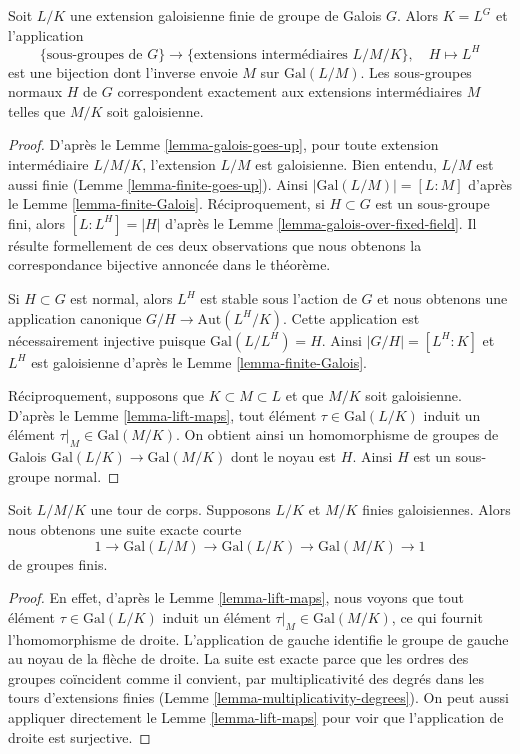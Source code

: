 \begin{theorem}
\label{theorem-galois-theory}
Soit $L/K$ une extension galoisienne finie de groupe de Galois $G$.
Alors $K = L^G$ et l'application
$$
\{\text{sous-groupes de }G\}
\longrightarrow
\{\text{extensions intermédiaires }L/M/K\},\quad
H \longmapsto L^H
$$
est une bijection dont l'inverse envoie $M$ sur $\text{Gal}(L/M)$.
Les sous-groupes normaux $H$ de $G$ correspondent exactement aux
extensions intermédiaires $M$ telles que $M/K$ soit galoisienne.
\end{theorem}

\begin{proof}
D'après le Lemme \ref{lemma-galois-goes-up}, pour toute extension intermédiaire $L/M/K$,
l'extension $L/M$ est galoisienne. Bien entendu, $L/M$ est aussi finie
(Lemme \ref{lemma-finite-goes-up}). Ainsi $|\text{Gal}(L/M)| = [L : M]$
d'après le Lemme \ref{lemma-finite-Galois}.
Réciproquement, si $H \subset G$ est un sous-groupe fini, alors
$[L : L^H] = |H|$ d'après le Lemme \ref{lemma-galois-over-fixed-field}.
Il résulte formellement de ces deux observations que nous obtenons
la correspondance bijective annoncée dans le théorème.

\medskip\noindent
Si $H \subset G$ est normal, alors $L^H$ est stable sous l'action de
$G$ et nous obtenons une application canonique $G/H \to \text{Aut}(L^H/K)$.
Cette application est nécessairement injective puisque $\text{Gal}(L/L^H) = H$. Ainsi
$|G/H| = [L^H : K]$ et $L^H$ est galoisienne d'après le
Lemme \ref{lemma-finite-Galois}.

\medskip\noindent
Réciproquement, supposons que $K \subset M \subset L$ et que $M/K$ soit galoisienne.
D'après le Lemme \ref{lemma-lift-maps}, tout
élément $\tau \in \text{Gal}(L/K)$ induit un élément
$\tau|_M \in \text{Gal}(M/K)$. On obtient ainsi un homomorphisme
de groupes de Galois $\text{Gal}(L/K) \to \text{Gal}(M/K)$ dont le
noyau est $H$. Ainsi $H$ est un sous-groupe normal.
\end{proof}

\begin{lemma}
\label{lemma-ses-galois}
Soit $L/M/K$ une tour de corps. Supposons $L/K$ et $M/K$ finies galoisiennes.
Alors nous obtenons une suite exacte courte
$$
1 \to \text{Gal}(L/M) \to \text{Gal}(L/K) \to \text{Gal}(M/K) \to 1
$$
de groupes finis.
\end{lemma}

\begin{proof}
En effet, d'après le Lemme \ref{lemma-lift-maps},
nous voyons que tout élément $\tau \in \text{Gal}(L/K)$ induit un élément
$\tau|_M \in \text{Gal}(M/K)$, ce qui fournit l'homomorphisme de
droite. L'application de gauche identifie le groupe de gauche au noyau
de la flèche de droite. La suite est exacte parce que les ordres
des groupes coïncident comme il convient, par multiplicativité des degrés
dans les tours d'extensions finies
(Lemme \ref{lemma-multiplicativity-degrees}).
On peut aussi appliquer directement le Lemme \ref{lemma-lift-maps}
pour voir que l'application de droite est surjective.
\end{proof}






